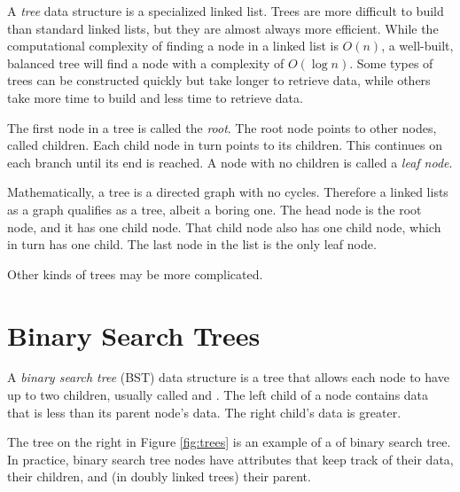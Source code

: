 A \emph{tree} data structure is a specialized linked list.
Trees are more difficult to build than standard linked lists, but they are almost always more efficient.
While the computational complexity of finding a node in a linked list is $O(n)$, a well-built, balanced tree will find a node with a complexity of $O(\log{n})$.
Some types of trees can be constructed quickly but take longer to retrieve data, while others take more time to build and less time to retrieve data.

The first node in a tree is called the \emph{root}.
The root node points to other nodes, called children.
Each child node in turn points to its children.
This continues on each branch until its end is reached.
A node with no children is called a \emph{leaf node}.

Mathematically, a tree is a directed graph with no cycles.
Therefore a linked lists as a graph qualifies as a tree, albeit a boring one.
The head node is the root node, and it has one child node.
That child node also has one child node, which in turn has one child.
The last node in the list is the only leaf node.

Other kinds of trees may be more complicated.

\section*{Binary Search Trees} %

A \emph{binary search tree} (BST) data structure is a tree that allows each node to have up to two children, usually called  and .
The left child of a node contains data that is less than its parent node's data.
The right child's data is greater.

The tree on the right in Figure \ref{fig:trees} is an example of a of binary search tree.
In practice, binary search tree nodes have attributes that keep track of their data, their children, and (in doubly linked trees) their parent.

